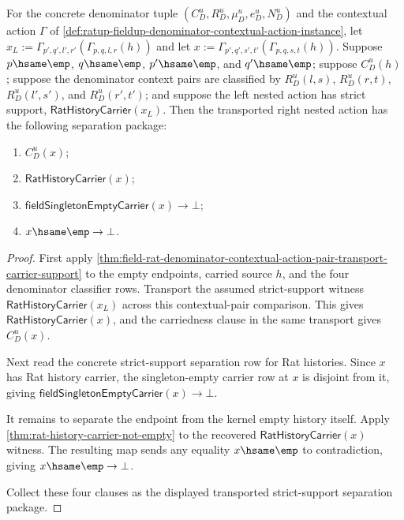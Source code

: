 \begin{theorem}
\label{thm:ratup-fieldup-transported-strict-support-separation-package}
For the concrete denominator tuple $(C_D^u,R_D^u,\mu_D^u,e_D^u,N_D^u)$ and the
contextual action $\Gamma$ of
\autoref{def:ratup-fieldup-denominator-contextual-action-instance}, let
$x_L:=\Gamma_{p',q',l',r'}(\Gamma_{p,q,l,r}(h))$ and let
$x:=\Gamma_{p',q',s',t'}(\Gamma_{p,q,s,t}(h))$. Suppose
$p\hsame\emp$, $q\hsame\emp$, $p'\hsame\emp$, and $q'\hsame\emp$; suppose
$C_D^u(h)$; suppose the denominator context pairs are classified by
$R_D^u(l,s)$, $R_D^u(r,t)$, $R_D^u(l',s')$, and $R_D^u(r',t')$; and suppose
the left nested action has strict support,
$\mathsf{RatHistoryCarrier}(x_L)$. Then the transported right nested action
has the following separation package:
\begin{enumerate}
  \item $C_D^u(x)$;
  \item $\mathsf{RatHistoryCarrier}(x)$;
  \item $\mathsf{fieldSingletonEmptyCarrier}(x)\to\bot$;
  \item $x\hsame\emp\to\bot$.
\end{enumerate}
\end{theorem}
\begin{proof}
First apply
\autoref{thm:field-rat-denominator-contextual-action-pair-transport-carrier-support}
to the empty endpoints, carried source $h$, and the four denominator classifier
rows. Transport the assumed strict-support witness
$\mathsf{RatHistoryCarrier}(x_L)$ across this contextual-pair comparison. This
gives $\mathsf{RatHistoryCarrier}(x)$, and the carriedness clause in the same
transport gives $C_D^u(x)$.

Next read the concrete strict-support separation row for Rat histories. Since
$x$ has Rat history carrier, the singleton-empty carrier row at $x$ is
disjoint from it, giving
$\mathsf{fieldSingletonEmptyCarrier}(x)\to\bot$.

It remains to separate the endpoint from the kernel empty history itself. Apply
\autoref{thm:rat-history-carrier-not-empty} to the recovered
$\mathsf{RatHistoryCarrier}(x)$ witness. The resulting map sends any equality
$x\hsame\emp$ to contradiction, giving $x\hsame\emp\to\bot$.

Collect these four clauses as the displayed transported strict-support
separation package.
\end{proof}

